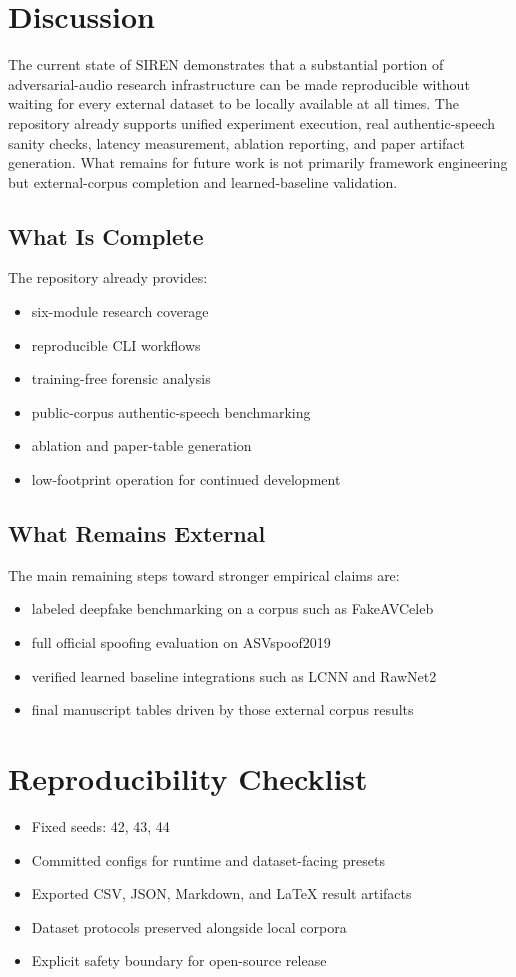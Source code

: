 \documentclass[conference]{IEEEtran}
\begin{document}
\section{Discussion}
The current state of SIREN demonstrates that a substantial portion of adversarial-audio research infrastructure can be made reproducible without waiting for every external dataset to be locally available at all times. The repository already supports unified experiment execution, real authentic-speech sanity checks, latency measurement, ablation reporting, and paper artifact generation. What remains for future work is not primarily framework engineering but external-corpus completion and learned-baseline validation.

\subsection{What Is Complete}
The repository already provides:
\begin{itemize}
\item six-module research coverage
\item reproducible CLI workflows
\item training-free forensic analysis
\item public-corpus authentic-speech benchmarking
\item ablation and paper-table generation
\item low-footprint operation for continued development
\end{itemize}

\subsection{What Remains External}
The main remaining steps toward stronger empirical claims are:
\begin{itemize}
\item labeled deepfake benchmarking on a corpus such as FakeAVCeleb
\item full official spoofing evaluation on ASVspoof2019
\item verified learned baseline integrations such as LCNN and RawNet2
\item final manuscript tables driven by those external corpus results
\end{itemize}

\section{Reproducibility Checklist}
\begin{itemize}
\item Fixed seeds: 42, 43, 44
\item Committed configs for runtime and dataset-facing presets
\item Exported CSV, JSON, Markdown, and LaTeX result artifacts
\item Dataset protocols preserved alongside local corpora
\item Explicit safety boundary for open-source release
\end{itemize}
\end{document}
